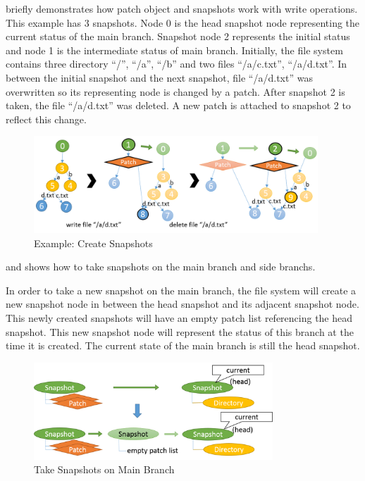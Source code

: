 	 briefly demonstrates how patch object and snapshots work with write operations. This example has 3 snapshots. Node 0 is the head snapshot node representing the current status of the main branch. Snapshot node 2 represents the initial status and node 1 is the intermediate status of main branch. Initially, the file system contains three directory ``/'', ``/a'', ``/b'' and two files ``/a/c.txt'', ``/a/d.txt''. In between the initial snapshot and the next snapshot, file ``/a/d.txt'' was overwritten so its representing node is changed by a patch. After snapshot 2 is taken, the file ``/a/d.txt'' was deleted. A new patch is attached to snapshot 2 to reflect this change.

\begin{figure}[hbtp]
\centering
\includegraphics[width=0.95\textwidth]{Chapter-4/figs/fig26.png}
\caption{Example: Create Snapshots}
\label{fig:create_snapshots}
\end{figure}

     and  shows how to take snapshots on the main branch and side branchs.

    In order to take a new snapshot on the main branch, the file system will create a new snapshot node in between the head snapshot and its adjacent snapshot node. This newly created snapshots will have an empty patch list referencing the head snapshot. This new snapshot node will represent the status of this branch at the time it is created. The current state of the main branch is still the head snapshot.

\begin{figure}[hbtp]
\centering
\includegraphics[width=0.8\textwidth]{Chapter-4/figs/fig20.png}
\caption{Take Snapshots on Main Branch}
\label{fig:take_snapshot_root}
\end{figure}
    
